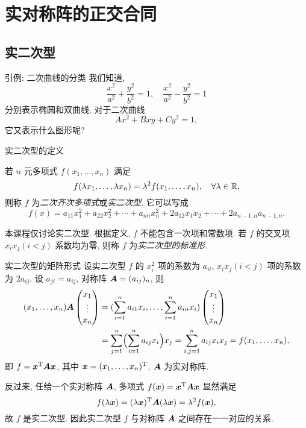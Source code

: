 \section{实对称阵的正交合同}

\subsection{实二次型}

\begin{frame}{引例: 二次曲线的分类}
	\onslide<+->
	我们知道,
	\[\frac{x^2}{a^2}+\frac{y^2}{b^2}=1,\quad
	\frac{x^2}{a^2}-\frac{y^2}{b^2}=1\]
	分别表示椭圆和双曲线.
	\onslide<+->
	对于二次曲线
	\[Ax^2+Bxy+Cy^2=1,\]
	它又表示什么图形呢?
\end{frame}


\begin{frame}{实二次型的定义}
	\onslide<+->
	\begin{definition}
		若 $n$ 元多项式 $f(x_1,\dots,x_n)$ 满足
		\[f(\lambda x_1,\dots,\lambda x_n)=\lambda^2f(x_1,\dots,x_n),\quad\forall\lambda\in{\mathbb{R}},\]
		则称 $f$ 为\emph{二次齐次多项式}或\emph{实二次型}.
		它可以写成
		\[f(x)=a_{11}x_1^2+a_{22}x_2^2+\cdots+a_{nn}x_n^2+2a_{12}x_1x_2+\cdots+2a_{n-1,n}a_{n-1,n}.\]
	\end{definition}
	\onslide<+->
	\alert{本课程仅讨论实二次型}.
	\onslide<+->
	根据定义, $f$ 不能包含一次项和常数项.
	\onslide<+->
	若 $f$ 的交叉项 $x_ix_j (i<j)$ 系数均为零, 则称 $f$ 为\emph{实二次型的标准形}.
\end{frame}


\begin{frame}{实二次型的矩阵形式}
	\onslide<+->
	设实二次型 $f$ 的 $x_i^2$ 项的系数为 $a_{ii}$, $x_ix_j (i<j)$ 项的系数为 $2a_{ij}$.
	\onslide<+->
	设 $a_{ji}=a_{ij}$, 对称阵 ${\boldsymbol{A}}=(a_{ij})_{n}$, 则
	\begin{align*}
		(x_1,\dots,x_n){\boldsymbol{A}}\begin{pmatrix}
			x_1\\\vdots\\x_n
		\end{pmatrix}
		&=(\sum_{i=1}^n a_{i1}x_i,\dots,\sum_{i=1}^n a_{in}x_i)\begin{pmatrix}
			x_1\\\vdots\\x_n
		\end{pmatrix}\\
		&=\sum_{j=1}^n\Bigl(\sum_{i=1}^n a_{ij}x_i\Bigr)x_j
		=\sum_{i,j=1}^n a_{ij}x_ix_j=f(x_1,\dots,x_n),
	\end{align*}
	\onslide<+->
	即 \alert{$f={\boldsymbol{x}}^{\mathrm{T}}{\boldsymbol{A}}{\boldsymbol{x}}$}, 其中 ${\boldsymbol{x}}=(x_1,\dots,x_n)^{\mathrm{T}}$, \alert{${\boldsymbol{A}}$ 为实对称阵}.

	\onslide<+->
	反过来, 任给一个实对称阵 ${\boldsymbol{A}}$, 多项式 $f({\boldsymbol{x}})={\boldsymbol{x}}^{\mathrm{T}}{\boldsymbol{A}}{\boldsymbol{x}}$ 显然满足
	\[f(\lambda {\boldsymbol{x}})=(\lambda{\boldsymbol{x}})^{\mathrm{T}}{\boldsymbol{A}}(\lambda{\boldsymbol{x}})=\lambda^2f({\boldsymbol{x}}),\]
	故 $f$ 是实二次型.
	\onslide<+->
	因此\alert{实二次型 $f$ 与对称阵 ${\boldsymbol{A}}$ 之间存在一一对应的关系}.
\end{frame}


